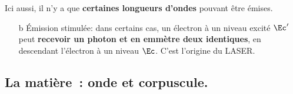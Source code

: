 \documentclass[../../main/main.tex]{subfiles}
\begin{document}
\hfill
\noindent
\begin{minipage}[t]{.25\linewidth}
	\begin{center}
	\end{center}
\end{minipage}
\smallbreak
Ici aussi, il n'y a que \textbf{certaines longueurs d'ondes} pouvant être
émises.
\smallbreak
\begin{itemize}
	\item[b]{Émission stimulée}: dans certains cas, un électron à un niveau
	excité $\Ec'$ peut \textbf{recevoir un photon et en emmètre deux
		identiques}, en descendant l'électron à un niveau $\Ec$.
	\bigbreak
	C'est l'origine du LASER.
\end{itemize}
\begin{center}
\end{center}

\subsection{La matière~: onde et corpuscule.}
\label{ssec:matonde}
\end{document}
